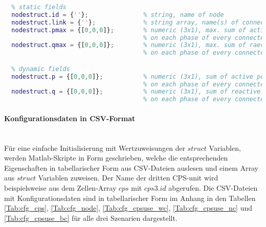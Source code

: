           \begin{lstlisting}[language=Matlab,caption=Funktion zur Strukturdefinition der Netzknoten, label=Code:prototype_node]
  % NODE STRUCTURE
  % static fields
  nodestruct.id = {''};               % string, name of node
  nodestruct.link = {''};             % string array, name(s) of connected node(s)
  nodestruct.pmax = {[0,0,0]};        % numeric (3x1), max. sum of active power [kW]
                                      % on each phase of every connected CPS-unit
  nodestruct.qmax = {[0,0,0]};        % numeric (3x1), max. sum of raective power [kvar] 
                                      % on each phase of every connected CPS-unit

  % dynamic fields
  nodestruct.p = {[0,0,0]};           % numeric (3x1), sum of active power [kW]
                                      % on each phase of every connected CPS-unit
  nodestruct.q = {[0,0,0]};           % numeric (3x1), sum of reactive power [kW]
                                      % on each phase of every connected CPS-unit
          \end{lstlisting}
			
            \paragraph{Konfigurationsdaten in CSV-Format} ~\\
            Für eine einfache Initialisierung mit Wertzuweisungen der $struct$ Variablen, werden Matlab-Skripte in Form geschrieben, welche die entsprechenden Eigenschaften in tabellarischer Form aus CSV-Dateien auslesen und einem Array aus $struct$ Variablen zuweisen. Der Name der dritten CPS-unit wird beispielsweise aus dem Zellen-Array $cps$ mit $cps{3}.id$ abgerufen. Die CSV-Dateien mit Konfigurationsdaten sind in tabellarischer Form im Anhang in den Tabellen \ref{Tab:cfg_cps}, \ref{Tab:cfg_node}, \ref{Tab:cfg_cpsuse_wc}, \ref{Tab:cfg_cpsuse_nc} und \ref{Tab:cfg_cpsuse_bc} für alle drei Szenarien dargestellt. \\
			
